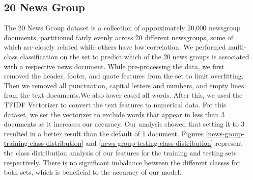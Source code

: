 \documentclass[11pt]{homework}
\begin{document}
\subsection{20 News Group}
The 20 News Group dataset is a collection of approximately 20,000 newsgroup documents, partitioned fairly evenly across 20 different newsgroups, some of which are closely related while others have low correlation. We performed multi-class classification on the set to predict which of the 20 news groups is associated with a respective news document. While pre-processing the data, we first removed the header, footer, and quote features from the set to limit overfitting. Then we removed all punctuation, capital letters and numbers, and empty lines from the text documents.We also lower cased all words. After this, we used the TFIDF Vectorizer to convert the text features to numerical data. For this dataset, we set the vectorizer to exclude words that appear in less than 3 documents as it increases our accuracy. Our analysis showed that setting it to 3 resulted in a better result than the default of 1 document. Figures \ref{news-group-training-class-distribution} and \ref{news-group-testing-class-distribution} represent the class distribution analysis of our features for the training and testing sets respectively. There is no significant imbalance between the different classes for both sets, which is beneficial to the accuracy of our model.
\end{document}
